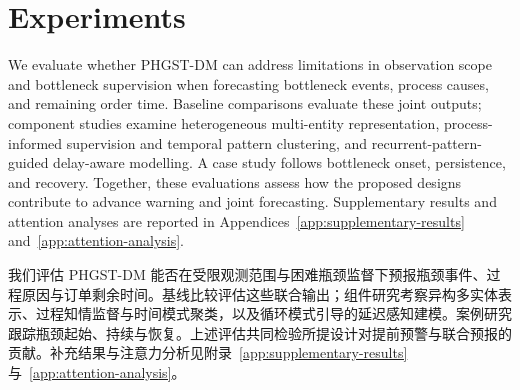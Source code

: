 \documentclass[a4paper,fleqn]{cas-dc}
\newcommand{\zhpara}[1]{%
  \par\begingroup\small\color{black!72}\noindent #1\par\endgroup}
\begin{document}
\FloatBarrier
\setcounter{topnumber}{4}
\setcounter{bottomnumber}{3}
\setcounter{totalnumber}{7}
\setcounter{dbltopnumber}{4}
\renewcommand{\topfraction}{0.9}
\renewcommand{\bottomfraction}{0.85}
\renewcommand{\textfraction}{0.08}
\renewcommand{\floatpagefraction}{0.7}
\renewcommand{\dbltopfraction}{0.9}
\renewcommand{\dblfloatpagefraction}{0.85}
\setlength{\floatsep}{10pt plus 2pt minus 2pt}
\setlength{\textfloatsep}{12pt plus 2pt minus 3pt}
\setlength{\dblfloatsep}{10pt plus 2pt minus 2pt}
\setlength{\dbltextfloatsep}{12pt plus 2pt minus 3pt}
\makeatletter
\def\@dbflt#1{\@ifnextchar[{\@xdblfloat{#1}}{%
  \edef\reserved@a{\noexpand\@xdblfloat{#1}[\csname fps@#1\endcsname]}%
  \reserved@a}}
\setlength{\@fpsep}{12pt plus 2pt minus 2pt}
\setlength{\@dblfpsep}{12pt plus 2pt minus 2pt}
\makeatother
\raggedbottom

\section{Experiments}\label{sec:exp}

We evaluate whether PHGST-DM can address limitations in observation scope and bottleneck supervision when forecasting bottleneck events, process causes, and remaining order time. Baseline comparisons evaluate these joint outputs; component studies examine heterogeneous multi-entity representation, process-informed supervision and temporal pattern clustering, and recurrent-pattern-guided delay-aware modelling. A case study follows bottleneck onset, persistence, and recovery. Together, these evaluations assess how the proposed designs contribute to advance warning and joint forecasting. Supplementary results and attention analyses are reported in Appendices~\ref{app:supplementary-results} and~\ref{app:attention-analysis}.

\zhpara{我们评估 PHGST-DM 能否在受限观测范围与困难瓶颈监督下预报瓶颈事件、过程原因与订单剩余时间。基线比较评估这些联合输出；组件研究考察异构多实体表示、过程知情监督与时间模式聚类，以及循环模式引导的延迟感知建模。案例研究跟踪瓶颈起始、持续与恢复。上述评估共同检验所提设计对提前预警与联合预报的贡献。补充结果与注意力分析见附录~\ref{app:supplementary-results} 与~\ref{app:attention-analysis}。}
\end{document}

